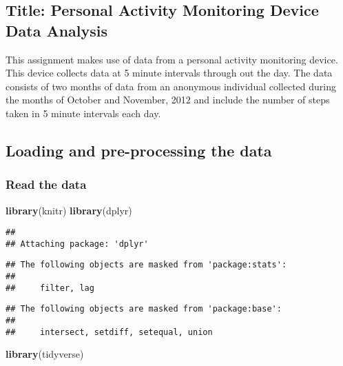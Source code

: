 \documentclass[
]{article}
\author{}
\date{\vspace{-2.5em}}
\newenvironment{Shaded}{\begin{snugshade}}{\end{snugshade}}
\newcommand{\KeywordTok}[1]{\textcolor[rgb]{0.13,0.29,0.53}{\textbf{#1}}}
\newcommand{\NormalTok}[1]{#1}
\begin{document}
\hypertarget{title-personal-activity-monitoring-device-data-analysis}{%
\subsection{\texorpdfstring{\textbf{Title: Personal Activity Monitoring
Device Data
Analysis}}{Title: Personal Activity Monitoring Device Data Analysis}}\label{title-personal-activity-monitoring-device-data-analysis}}

This assignment makes use of data from a personal activity monitoring
device. This device collects data at 5 minute intervals through out the
day. The data consists of two months of data from an anonymous
individual collected during the months of October and November, 2012 and
include the number of steps taken in 5 minute intervals each day.

\hypertarget{loading-and-pre-processing-the-data}{%
\subsection{Loading and pre-processing the
data}\label{loading-and-pre-processing-the-data}}

\hypertarget{read-the-data}{%
\subsubsection{Read the data}\label{read-the-data}}

\begin{Shaded}
\begin{Highlighting}[]
\KeywordTok{library}\NormalTok{(knitr)}
\KeywordTok{library}\NormalTok{(dplyr)}
\end{Highlighting}
\end{Shaded}

\begin{verbatim}
## 
## Attaching package: 'dplyr'
\end{verbatim}

\begin{verbatim}
## The following objects are masked from 'package:stats':
## 
##     filter, lag
\end{verbatim}

\begin{verbatim}
## The following objects are masked from 'package:base':
## 
##     intersect, setdiff, setequal, union
\end{verbatim}

\begin{Shaded}
\begin{Highlighting}[]
\KeywordTok{library}\NormalTok{(tidyverse)}
\end{Highlighting}
\end{Shaded}
\end{document}
